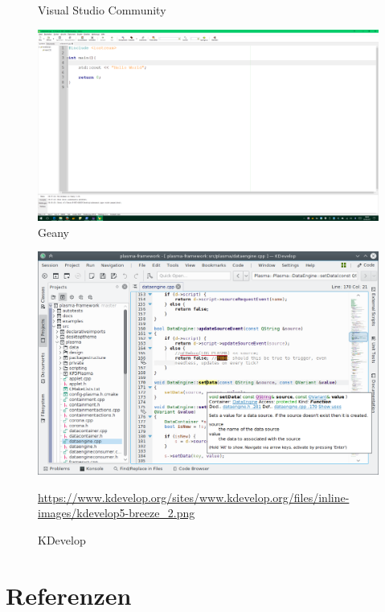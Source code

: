 \documentclass[a4paper]{report}
\begin{document}
\begin{center}
\begin{figure}
	\caption{Visual Studio Community}
	\label{pic:visualstudio}	
\end{figure}
\begin{figure}
	\includegraphics[width = \textwidth]{01/geany.png}
	\caption{Geany}
	\label{pic:geany}	
\end{figure}
\begin{figure}
	\includegraphics[width = \textwidth]{01/kdevelop.png}
	\caption{KDevelop}
	\url{https://www.kdevelop.org/sites/www.kdevelop.org/files/inline-images/kdevelop5-breeze_2.png}
	\label{pic:kdevelop}	
	\label{end:ide:picts}
\end{figure}
\end{center}

\section{Referenzen}
\end{document}
